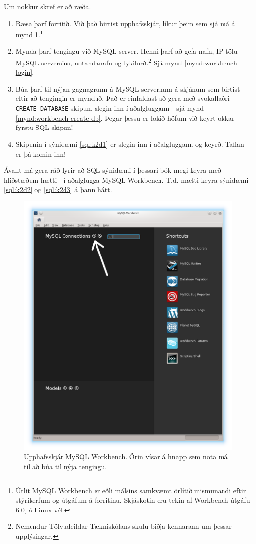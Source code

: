 Um nokkur skref er að ræða.
\begin{enumerate}
 \item Ræsa þarf forritið. Við það birtist upphafsskjár, líkur þeim sem sjá má á mynd \ref{mynd:workbench-upphafsskjar}.\footnote{Útlit MySQL Workbench er eðli málsins samkvæmt örlítið mismunandi eftir stýrikerfum og útgáfum á forritinu. Skjáskotin eru tekin af Workbench útgáfu 6.0, á Linux vél.}
 \item Mynda þarf tengingu við MySQL-server. Henni þarf að gefa nafn, IP-tölu MySQL serversins, notandanafn og lykilorð.\footnote{Nemendur Tölvudeildar Tækniskólans skulu biðja kennarann um þessar upplýsingar.} Sjá mynd \ref{mynd:workbench-login}.
 \item Búa þarf til nýjan gagnagrunn á MySQL-servernum á skjánum sem birtist eftir að tengingin er mynduð. Það er einfaldast að gera með svokallaðri \verb|CREATE DATABASE| skipun, slegin inn í aðalgluggann - sjá mynd \ref{mynd:workbench-create-db}. Þegar þessu er lokið höfum við keyrt okkar fyrstu SQL-skipun!
 \item Skipunin í sýnidæmi \ref{sql:k2d1} er slegin inn í aðalgluggann og keyrð. Taflan er þá komin inn!
\end{enumerate}
Ávallt má gera ráð fyrir að SQL-sýnidæmi í þessari bók megi keyra með hliðstæðum hætti - í aðalglugga MySQL Workbench. T.d. mætti keyra sýnidæmi \ref{sql:k2d2} og \ref{sql:k2d3} á þann hátt.

\begin{figure}
\caption[Upphafsskjár MySQL Workbench]{Upphafsskjár MySQL Workbench. Örin vísar á hnapp sem nota má til að búa til nýja tengingu.}
\label{mynd:workbench-upphafsskjar}
\centering
\includegraphics[width=\linewidth]{myndir/workbench-upphafsskjar-or}
\end{figure}

